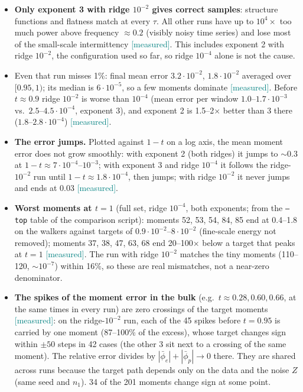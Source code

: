 \documentclass[11pt,a4paper]{article}
\newcommand{\code}[1]{\texttt{#1}}
\newcommand{\meas}{\textcolor{teal}{\textsf{[measured]}}}
\begin{document}
\begin{itemize}
  \item \textbf{Only exponent 3 with ridge $10^{-2}$ gives correct samples}: structure
        functions and flatness match at every $\tau$. All other runs have up to $10^4\times$ too
        much power above frequency $\approx0.2$ (visibly noisy time series) and lose most of the
        small-scale intermittency \meas. This includes exponent 2 with ridge $10^{-2}$, the
        configuration used so far, so ridge $10^{-4}$ alone is not the cause.
  \item Even that run misses 1\%: final mean error $3.2\cdot10^{-2}$, $1.8\cdot10^{-2}$ averaged
        over $[0.95,1)$; its median is $6\cdot10^{-5}$, so a few moments dominate \meas. Before
        $t\approx0.9$ ridge $10^{-2}$ is worse than $10^{-4}$ (mean error per window
        $1.0$--$1.7\cdot10^{-3}$ vs.\ $2.5$--$4.5\cdot10^{-4}$, exponent 3), and exponent 2 is
        1.5--2$\times$ better than 3 there ($1.8$--$2.8\cdot10^{-4}$) \meas.
  \item \textbf{The error jumps.} Plotted against $1-t$ on a log axis, the mean moment error
        does not grow smoothly: with exponent 2 (both ridges) it jumps to $\sim0.3$ at
        $1-t\approx7\cdot10^{-4}$--$10^{-3}$; with exponent 3 and ridge $10^{-4}$ it follows the
        ridge-$10^{-2}$ run until $1-t\approx1.8\cdot10^{-4}$, then jumps; with ridge $10^{-2}$ it
        never jumps and ends at 0.03 \meas.
  \item \textbf{Worst moments at $t=1$} (full set, ridge $10^{-4}$, both exponents; from the
        \code{--top} table of the comparison script): moments 52, 53, 54, 84, 85 end at 0.4--1.8 on
        the walkers against targets of $0.9\cdot10^{-2}$--$8\cdot10^{-2}$ (fine-scale energy not removed); moments
        37, 38, 47, 63, 68 end 20--100$\times$ below a target that peaks at $t=1$ \meas. The run
        with ridge $10^{-2}$ matches the tiny moments (110--120, $\sim10^{-7}$) within 16\%, so
        these are real mismatches, not a near-zero denominator.
  \item \textbf{The spikes of the moment error in the bulk} (e.g.\ $t\approx0.28, 0.60, 0.66$, at the
        same times in every run) are zero crossings of the target moments \meas: on the ridge-$10^{-2}$
        run, each of the 45 spikes before $t=0.95$ is carried by one moment (87--100\% of the excess),
        whose target changes sign within $\pm50$ steps in 42 cases (the other 3 sit next to a crossing of
        the same moment). The relative error divides by $|\bar\phi_e|+|\bar\phi_p|\to0$ there. They are
        shared across runs because the target path depends only on the data and the noise $Z$ (same seed
        and $n_1$). 34 of the 201 moments change sign at some point.
\end{itemize}
\end{document}

